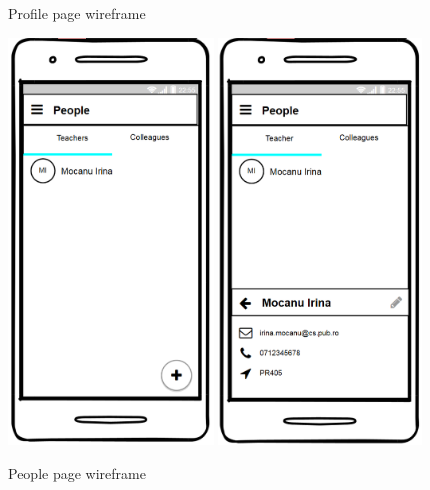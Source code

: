 \begin{figure}[!ht]
\begin{minipage}[t]{0.3\textwidth}
        \caption{Profile page wireframe}
        \label{4:fig:balsamiq_profile}
    \end{minipage}
    \hfill
    \begin{minipage}[t]{0.63\textwidth}
        \captionsetup{justification=centering}
        \includegraphics[width=0.485\textwidth]{figures/app/balsamiq/people.png}
        \includegraphics[width=0.48\textwidth]{figures/app/balsamiq/teacher.png}
        \caption{People page wireframe}
        \label{4:fig:balsamiq_people}
    \end{minipage}
\end{figure}

